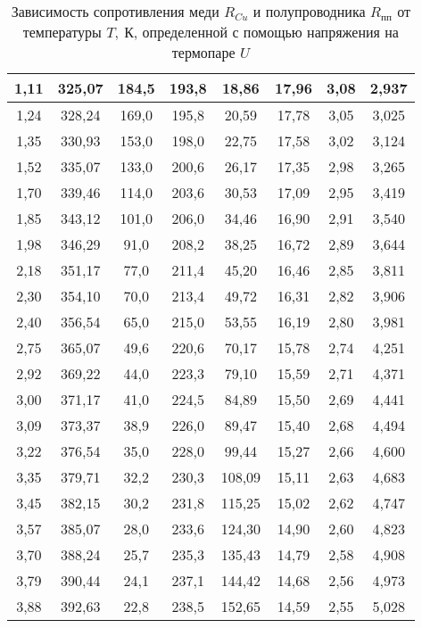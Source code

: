 \documentclass[a4paper, 12pt]{article}
\begin{document}
\begin{table}[H]
\begin{tabular}{|c|c|c|c|c|c|c|c|}
1,11  & 325,07 & 184,5   & 193,8   & 18,86  & 17,96 & 3,08 & 2,937  \\ \hline
1,24  & 328,24 & 169,0   & 195,8   & 20,59  & 17,78 & 3,05 & 3,025  \\ \hline
1,35  & 330,93 & 153,0   & 198,0   & 22,75  & 17,58 & 3,02 & 3,124  \\ \hline
1,52  & 335,07 & 133,0   & 200,6   & 26,17  & 17,35 & 2,98 & 3,265  \\ \hline
1,70  & 339,46 & 114,0   & 203,6   & 30,53  & 17,09 & 2,95 & 3,419  \\ \hline
1,85  & 343,12 & 101,0   & 206,0   & 34,46  & 16,90 & 2,91 & 3,540  \\ \hline
1,98  & 346,29 & 91,0    & 208,2   & 38,25  & 16,72 & 2,89 & 3,644  \\ \hline
2,18  & 351,17 & 77,0    & 211,4   & 45,20  & 16,46 & 2,85 & 3,811  \\ \hline
2,30  & 354,10 & 70,0    & 213,4   & 49,72  & 16,31 & 2,82 & 3,906  \\ \hline
2,40  & 356,54 & 65,0    & 215,0   & 53,55  & 16,19 & 2,80 & 3,981  \\ \hline
2,75  & 365,07 & 49,6    & 220,6   & 70,17  & 15,78 & 2,74 & 4,251  \\ \hline
2,92  & 369,22 & 44,0    & 223,3   & 79,10  & 15,59 & 2,71 & 4,371  \\ \hline
3,00  & 371,17 & 41,0    & 224,5   & 84,89  & 15,50 & 2,69 & 4,441  \\ \hline
3,09  & 373,37 & 38,9    & 226,0   & 89,47  & 15,40 & 2,68 & 4,494  \\ \hline
3,22  & 376,54 & 35,0    & 228,0   & 99,44  & 15,27 & 2,66 & 4,600  \\ \hline
3,35  & 379,71 & 32,2    & 230,3   & 108,09 & 15,11 & 2,63 & 4,683  \\ \hline
3,45  & 382,15 & 30,2    & 231,8   & 115,25 & 15,02 & 2,62 & 4,747  \\ \hline
3,57  & 385,07 & 28,0    & 233,6   & 124,30 & 14,90 & 2,60 & 4,823  \\ \hline
3,70  & 388,24 & 25,7    & 235,3   & 135,43 & 14,79 & 2,58 & 4,908  \\ \hline
3,79  & 390,44 & 24,1    & 237,1   & 144,42 & 14,68 & 2,56 & 4,973  \\ \hline
3,88  & 392,63 & 22,8    & 238,5   & 152,65 & 14,59 & 2,55 & 5,028  \\ \hline
\end{tabular}
\caption{Зависимость сопротивления меди $R_{Cu}$ и полупроводника
$R_{пп}$ от температуры $T,\: К$, определенной с помощью напряжения на
термопаре $U$}
\end{table}
\end{document}
